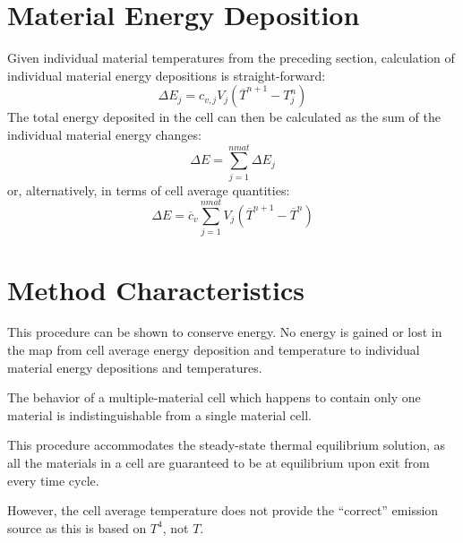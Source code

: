 \documentclass[12pt]{article}
\begin{document}
\section{Material Energy Deposition}
Given individual material temperatures from the preceding section,
calculation of individual material energy depositions is straight-forward:
\begin{equation}
\Delta E_{j} = c_{v,j} V_{j} (\overline{T}^{n+1}-T_{j}^{n})
\end{equation}
The total energy deposited in the cell can then be calculated as
the sum of the individual material energy changes:
\begin{equation}
\Delta E = \sum_{j=1}^{nmat} \Delta E_{j}
\end{equation}
or, alternatively, in terms of cell average quantities:
\begin{equation}
\Delta E = \overline{c}_{v}\sum_{j=1}^{nmat} V_{j}
(\overline{T}^{n+1} - \overline{T}^{n})
\end{equation}


\section{Method Characteristics}

This procedure can be shown to conserve energy. No energy is gained or
lost in the map from cell average energy deposition and temperature to
individual material energy depositions and temperatures.

The behavior of a multiple-material cell which happens to contain
only  one material is indistinguishable from a single material cell.

This procedure  accommodates the steady-state thermal equilibrium
solution, as all the materials in a cell are guaranteed to be at
equilibrium upon exit from every time cycle.

However, the cell average temperature does not provide the ``correct''
emission source as this is based on $T^4$, not $T$.

\nocite{MihalasMihalas}


\end{document}
